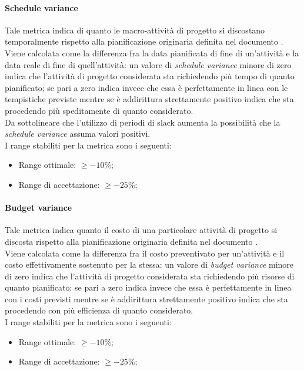 			\paragraph[Schedule variance]{\hypertarget{sv}{Schedule variance}}
			Tale metrica indica di quanto le macro-attività di progetto si discostano temporalmente rispetto alla pianificazione originaria definita nel documento \PdP . 
			\\Viene calcolata come la
differenza fra la data pianificata di fine di un’attività e la data
reale di fine di quell’attività: un valore di \textit{schedule variance} minore di zero indica che l'attività di progetto considerata sta richiedendo più tempo di quanto pianificato; se pari a zero indica invece che essa è perfettamente in linea con le tempistiche previste mentre se è addirittura strettamente positivo indica che sta procedendo più speditamente di quanto considerato. 
			\\Da sottolineare che l'utilizzo di periodi di slack aumenta la possibilità che la \textit{schedule variance} assuma valori positivi.
			\\I range stabiliti per la metrica sono i seguenti:
				\begin{itemize}
					\item Range ottimale: $\geq{-10}$\%;
					\item Range di accettazione: $\geq{-25}$\%;
				\end{itemize}

			\paragraph[Budget variance]{\hypertarget{bv}{Budget variance}}
			Tale metrica indica quanto il costo di una particolare attività di progetto si discosta rispetto alla pianificazione originaria definita nel documento \PdP. 
			\\Viene calcolata come la differenza fra il costo preventivato per un'attività e il costo effettivamente sostenuto per la stessa: un valore di \textit{budget variance} minore di zero indica che l'attività di progetto considerata sta richiedendo più risorse di quanto pianificato: se pari a zero indica invece che essa è perfettamente in linea con i costi previsti mentre se è addirittura strettamente positivo indica che sta procedendo con più efficienza di quanto considerato.
			\\I range stabiliti per la metrica sono i seguenti:
				\begin{itemize}
					\item Range ottimale: $\geq{-10}$\%;
					\item Range di accettazione: $\geq{-25}$\%;
				\end{itemize}
				
